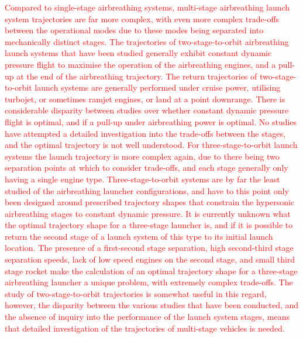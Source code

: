   	   \textcolor{red}{
  	  Compared to single-stage airbreathing systems, multi-stage airbreathing launch system trajectories are far more complex, with even more complex trade-offs between the operational modes due to these modes being separated into mechanically distinct stages\cite{Bulirsch1995}. The trajectories of two-stage-to-orbit airbreathing launch systems that have been studied generally exhibit constant dynamic pressure flight to maximise the operation of the airbreathing engines, and a pull-up at the end of the airbreathing trajectory. The return trajectories of two-stage-to-orbit launch systems are generally performed under cruise power, utilising turbojet, or sometimes ramjet engines\cite{Wilhite1991,Mehta2001,Eklund2012,Bradford2002}, or land at a point downrange\cite{Takahashi1997}. There is considerable disparity between studies over whether constant dynamic pressure flight is optimal, and if a pull-up under airbreathing power is optimal\cite{Wilhite1991,Fujikawa2017,Mehta2001,Takahashi1997,Aberleen,Germain2001,Eklund2012,Bradford2002,Kimura1999,Preller2018a}. No studies have attempted a detailed investigation into the trade-offs between the stages, and the optimal trajectory is not well understood. 
  	   For three-stage-to-orbit launch systems the launch trajectory is more complex again, due to there being two separation points at which to consider trade-offs, and each stage generally only having a single engine type. Three-stage-to-orbit systems are by far the least studied of the airbreathing launcher configurations, and have to this point only been designed around prescribed trajectory shapes that constrain the hypersonic airbreathing stages to constant dynamic pressure\cite{Kimura1999,Preller2018a}. It is currently unknown what the optimal trajectory shape for a three-stage launcher is, and if it is possible to return the second stage of a launch system of this type to its initial launch location. The presence of a first-second stage separation, high second-third stage separation speeds, lack of low speed engines on the second stage, and small third stage rocket make the calculation of an optimal trajectory shape for a three-stage airbreathing launcher a unique problem, with extremely complex trade-offs. The study of two-stage-to-orbit trajectories is somewhat useful in this regard, however, the disparity between the various studies that have been conducted, and the absence of inquiry into the performance of the launch system stages, means that detailed investigation of the trajectories of multi-stage vehicles is needed. 
  	}
  	   
